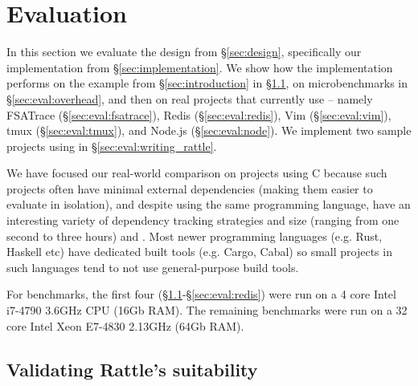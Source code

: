 \section{Evaluation}
\label{sec:evaluation}

In this section we evaluate the design from \S\ref{sec:design}, specifically our implementation from \S\ref{sec:implementation}. We show how the implementation performs on the example from \S\ref{sec:introduction} in \S\ref{sec:eval:introduction}, on microbenchmarks in \S\ref{sec:eval:overhead}, and then on real projects that currently use \Make{} -- namely FSATrace (\S\ref{sec:eval:fsatrace}), Redis (\S\ref{sec:eval:redis}), Vim (\S\ref{sec:eval:vim}), tmux (\S\ref{sec:eval:tmux}), and Node.js (\S\ref{sec:eval:node}). We implement two sample projects using \Rattle in \S\ref{sec:eval:writing_rattle}.

We have focused our real-world comparison on \Make projects using C because such projects often have minimal external dependencies (making them easier to evaluate in isolation), and despite using the same programming language, have an interesting variety of dependency tracking strategies and size (ranging from one second to three hours) and . Most newer programming languages (e.g. Rust, Haskell etc) have dedicated built tools (e.g. Cargo, Cabal) so small projects in such languages tend to not use general-purpose build tools.


For benchmarks, the first four (\S\ref{sec:eval:introduction}-\S\ref{sec:eval:redis}) were run on a 4 core Intel i7-4790 3.6GHz CPU (16Gb RAM). The remaining benchmarks were run on a 32 core Intel Xeon E7-4830 2.13GHz (64Gb RAM).

\subsection{Validating Rattle's suitability}
\label{sec:eval:introduction}

